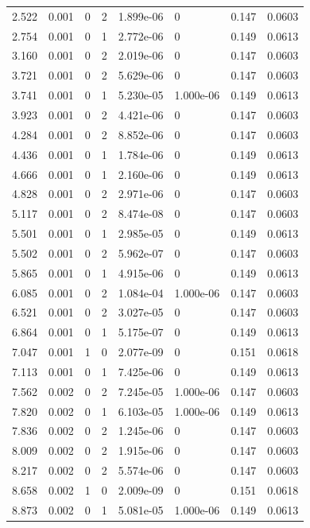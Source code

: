 \documentclass[preview]{standalone}
\begin{document}
{{\begin{tabular}{L{1.2cm}C{1.2cm} C{0.3cm}C{0.5cm} C{1.4cm}C{1.4cm} C{1.4cm}C{1.4cm}}
  2.522  &  0.001  & 0     &  2 &  1.899e-06  & 0  & 0.147 &  0.0603   \\ 
  2.754  &  0.001  & 0     &  1 &  2.772e-06  & 0  & 0.149 &  0.0613   \\ 
  3.160  &  0.001  & 0     &  2 &  2.019e-06  & 0  & 0.147 &  0.0603   \\ 
  3.721  &  0.001  & 0     &  2 &  5.629e-06  & 0  & 0.147 &  0.0603   \\ 
  3.741  &  0.001  & 0     &  1 &  5.230e-05  & 1.000e-06  & 0.149 &  0.0613   \\ 
  3.923  &  0.001  & 0     &  2 &  4.421e-06  & 0  & 0.147 &  0.0603   \\ 
  4.284  &  0.001  & 0     &  2 &  8.852e-06  & 0  & 0.147 &  0.0603   \\ 
  4.436  &  0.001  & 0     &  1 &  1.784e-06  & 0  & 0.149 &  0.0613   \\ 
  4.666  &  0.001  & 0     &  1 &  2.160e-06  & 0  & 0.149 &  0.0613   \\ 
  4.828  &  0.001  & 0     &  2 &  2.971e-06  & 0  & 0.147 &  0.0603   \\ 
  5.117  &  0.001  & 0     &  2 &  8.474e-08  & 0  & 0.147 &  0.0603   \\ 
  5.501  &  0.001  & 0     &  1 &  2.985e-05  & 0  & 0.149 &  0.0613   \\ 
  5.502  &  0.001  & 0     &  2 &  5.962e-07  & 0  & 0.147 &  0.0603   \\ 
  5.865  &  0.001  & 0     &  1 &  4.915e-06  & 0  & 0.149 &  0.0613   \\ 
  6.085  &  0.001  & 0     &  2 &  1.084e-04  & 1.000e-06  & 0.147 &  0.0603   \\ 
  6.521  &  0.001  & 0     &  2 &  3.027e-05  & 0  & 0.147 &  0.0603   \\ 
  6.864  &  0.001  & 0     &  1 &  5.175e-07  & 0  & 0.149 &  0.0613   \\ 
  7.047  &  0.001  & 1     &  0 &  2.077e-09  & 0  & 0.151 &  0.0618   \\ 
  7.113  &  0.001  & 0     &  1 &  7.425e-06  & 0  & 0.149 &  0.0613   \\ 
  7.562  &  0.002  & 0     &  2 &  7.245e-05  & 1.000e-06  & 0.147 &  0.0603   \\ 
  7.820  &  0.002  & 0     &  1 &  6.103e-05  & 1.000e-06  & 0.149 &  0.0613   \\ 
  7.836  &  0.002  & 0     &  2 &  1.245e-06  & 0  & 0.147 &  0.0603   \\ 
  8.009  &  0.002  & 0     &  2 &  1.915e-06  & 0  & 0.147 &  0.0603   \\ 
  8.217  &  0.002  & 0     &  2 &  5.574e-06  & 0  & 0.147 &  0.0603   \\ 
  8.658  &  0.002  & 1     &  0 &  2.009e-09  & 0  & 0.151 &  0.0618   \\ 
  8.873  &  0.002  & 0     &  1 &  5.081e-05  & 1.000e-06  & 0.149 &  0.0613   \\ 
\hline 
\end{tabular} 

}}
\end{document}
